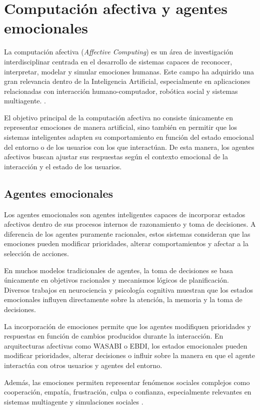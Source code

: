 \section{Computación afectiva y agentes emocionales}

La computación afectiva (\textit{Affective Computing}) es un área de investigación interdisciplinar centrada en el desarrollo de sistemas capaces de reconocer, interpretar, modelar y simular emociones humanas. Este campo ha adquirido una gran relevancia dentro de la Inteligencia Artificial, especialmente en aplicaciones relacionadas con interacción humano-computador, robótica social y sistemas multiagente. \cite{picard2000affective}.

El objetivo principal de la computación afectiva no consiste únicamente en representar emociones de manera artificial, sino también en permitir que los sistemas inteligentes adapten su comportamiento en función del estado emocional del entorno o de los usuarios con los que interactúan. De esta manera, los agentes afectivos buscan ajustar sus respuestas según el contexto emocional de la interacción y el estado de los usuarios.

\subsection{Agentes emocionales}

Los agentes emocionales son agentes inteligentes capaces de incorporar estados afectivos dentro de sus procesos internos de razonamiento y toma de decisiones. A diferencia de los agentes puramente racionales, estos sistemas consideran que las emociones pueden modificar prioridades, alterar comportamientos y afectar a la selección de acciones.

En muchos modelos tradicionales de agentes, la toma de decisiones se basa únicamente en objetivos racionales y mecanismos lógicos de planificación. Diversos trabajos en neurociencia y psicología cognitiva muestran que los estados emocionales influyen directamente sobre la atención, la memoria y la toma de decisiones.

La incorporación de emociones permite que los agentes modifiquen prioridades y respuestas en función de cambios producidos durante la interacción. En arquitecturas afectivas como WASABI o EBDI, los estados emocionales pueden modificar prioridades, alterar decisiones o influir sobre la manera en que el agente interactúa con otros usuarios y agentes del entorno.

Además, las emociones permiten representar fenómenos sociales complejos como cooperación, empatía, frustración, culpa o confianza, especialmente relevantes en sistemas multiagente y simulaciones sociales \cite{argente2022normative}.


